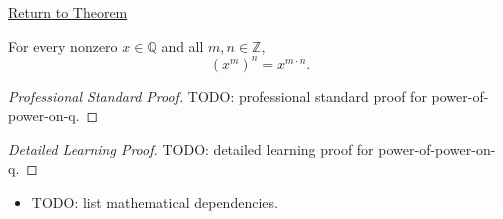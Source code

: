 \newpage
{}
\label{prf:power-of-power-on-q}

\begin{remark*}[Return]
\hyperref[cor:power-of-power-on-q]{Return to Theorem}
\end{remark*}

\begin{corollary*}
For every nonzero $x\in\mathbb{Q}$ and all $m,n\in\mathbb{Z}$,
\[
(x^m)^n=x^{m\cdot n}.
\]
\end{corollary*}

\begin{proof}[Professional Standard Proof]
\LRAProofBodyStart
TODO: professional standard proof for power-of-power-on-q.
\end{proof}

\begin{proof}[Detailed Learning Proof]
\LRAProofBodyStart
TODO: detailed learning proof for power-of-power-on-q.
\end{proof}

\begin{remark*}
\end{remark*}

\begin{dependencies}
\begin{itemize}
  \item TODO: list mathematical dependencies.
\end{itemize}
\end{dependencies}

\clearpage
